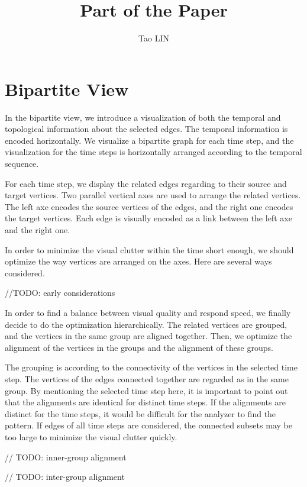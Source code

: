 \documentclass{article}
\title{Part of the Paper}
\author{Tao LIN}
\begin{document}
\maketitle

\section{Bipartite View}

In the bipartite view, we introduce a visualization of both the temporal and topological information about the selected edges.
The temporal information is encoded horizontally. We visualize a bipartite graph for each time step, and the visualization for the time steps is horizontally arranged according to the temporal sequence.

For each time step, we display the related edges regarding to their source and target vertices. Two parallel vertical axes are used to arrange the related vertices. The left axe encodes the source vertices of the edges, and the right one encodes the target vertices. Each edge is visually encoded as a link between the left axe and the right one. 

In order to minimize the visual clutter within the time short enough, we should optimize the way vertices are arranged on the axes.
Here are several ways considered.

//TODO: early considerations

In order to find a balance between visual quality and respond speed, we finally decide to do the optimization hierarchically. The related vertices are grouped, and the vertices in the same group are aligned together. Then, we optimize the alignment of the vertices in the groups and the alignment of these groups.

The grouping is according to the connectivity of the vertices in the selected time step. The vertices of the edges connected together are regarded as in the same group. By mentioning the selected time step here, it is important to point out that the alignments are identical for distinct time steps. If the alignments are distinct for the time steps, it would be difficult for the analyzer to find the pattern. If edges of all time steps are considered, the connected subsets may be too large to minimize the visual clutter quickly.

// TODO: inner-group alignment

// TODO: inter-group alignment
\end{document}
